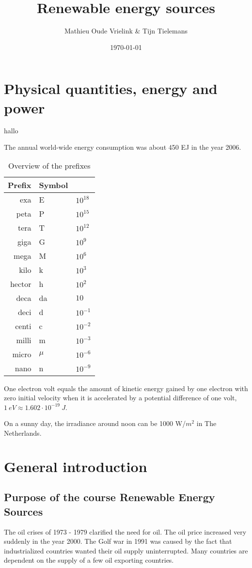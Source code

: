 \documentclass[a4paper,10pt]{article}
\title{Renewable energy sources}
\author{Mathieu Oude Vrielink \& Tijn Tielemans}
\date{\today}
\begin{document}
\maketitle

\section{Physical quantities, energy and power}
hallo

The annual world-wide energy consumption was about 450 EJ in the year 2006.

\begin{table}[ht]
\centering
 \begin{tabular}{r|ll}
  Prefix & Symbol & \\ \hline
  exa & E & $10^{18}$ \\
  peta & P & $10^{15}$ \\
  tera & T & $10^{12}$ \\
  giga & G & $10^{9}$ \\
  mega & M & $10^{6}$ \\
  kilo & k & $10^{3}$ \\
  hector & h & $10^{2}$ \\
  deca & da & $10$ \\
  deci& d & $10^{-1}$\\
  centi& c&$10^{-2}$\\
  milli& m&$10^{-3}$\\
  micro& $\mu$&$10^{-6}$\\
  nano& n&$10^{-9}$\\
 \end{tabular}
\caption{Overview of the prefixes}
\label{tab:prefixes}
\end{table}
One electron volt equals the amount of kinetic energy gained by one electron with zero initial velocity when it is accelerated by a potential difference of one volt, $1 \ eV \approx 1.602 \cdot 10^{-19}\ J$. \bigskip

On a sunny day, the irradiance around noon can be 1000 W/$m^2$ in The Netherlands.


\section{General introduction}

\subsection{Purpose of the course Renewable Energy Sources}
The oil crises of 1973 - 1979 clarified the need for oil. The oil price increased very suddenly in the year 2000. The Golf war in 1991 was caused by the fact that industrialized countries wanted their oil supply uninterrupted. Many countries are dependent on the supply of a few oil exporting countries. \bigskip
\end{document}
